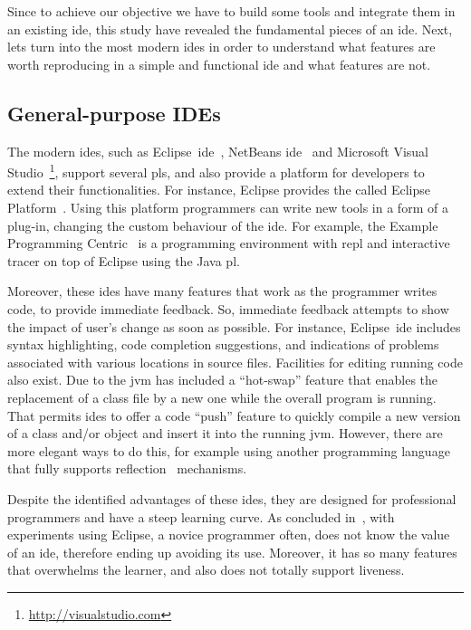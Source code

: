 Since to achieve our objective we have to build some tools and integrate them in an existing \ac{ide}, this study have revealed the fundamental pieces of an \ac{ide}. Next, lets turn into the most modern \ac{ide}s in order to understand what features are worth reproducing in a simple and functional \ac{ide} and what features are not.

\subsection{General-purpose IDEs}
\label{sec:ide}

The modern \ac{ide}s, such as Eclipse~\ac{ide}~\cite{carlson2005eclipse}, NetBeans \ac{ide}~\cite{boudreau2002netbeans} and Microsoft Visual Studio~\footnote{\url{http://visualstudio.com}}, support several \ac{pl}s, and also provide a platform for developers to extend their functionalities. For instance, Eclipse provides the called Eclipse Platform~\cite{desrivieres2004eclipse}. Using this platform programmers can write new tools in a form of a plug-in, changing the custom behaviour of the \ac{ide}. For example, the Example Programming Centric~\cite{edwards2004example} is a programming environment with \ac{repl} and interactive tracer on top of Eclipse using the Java \ac{pl}.

Moreover, these \ac{ide}s have many features that work as the programmer writes code, to provide immediate feedback.
So, immediate feedback attempts to show the impact of user's change as soon as possible. For instance, Eclipse~\ac{ide} includes syntax highlighting, code completion suggestions, and indications of problems associated with various locations in source files. Facilities for editing running code also exist. Due to the \ac{jvm} has included a “hot-swap” feature that enables the replacement of a class file by a new one while the overall program is running. That permits \ac{ide}s to offer a code “push” feature to quickly compile a new version of a class and/or object and insert it into the running \ac{jvm}. However, there are more elegant ways to do this, for example using another programming language that fully supports reflection~\cite{bobrow1993clos} mechanisms.

Despite the identified advantages of these \ac{ide}s, they are designed for professional programmers and have a steep learning curve. As concluded in~\cite{Chen:2005:EEI:1089053.1089068}, with experiments using Eclipse, a novice programmer often, does not know the value of an \ac{ide}, therefore ending up avoiding its use. Moreover, it has so many features that overwhelms the learner, and also does not totally support liveness.

